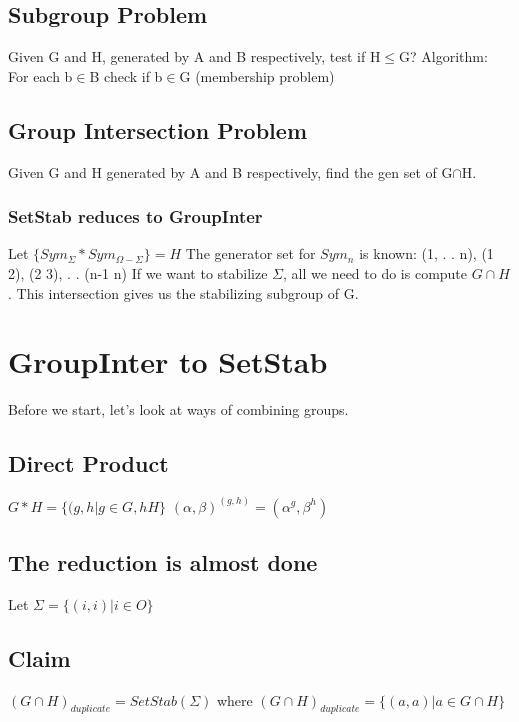 \subsection{Subgroup Problem}
Given G and H, generated by A and B respectively, test if H$\leq$G?\newline \newline
Algorithm:
\,For each b$\in$B check if b$\in$G (membership problem)

\subsection{Group Intersection Problem}
Given G and H generated by A and B respectively, find the gen set of G$\cap$H.


\subsubsection{SetStab reduces to GroupInter}
Let $\{Sym_{\Sigma} * Sym_{\Omega - \Sigma}\} = H$\newline
The generator set for $Sym_n$ is known: (1, . . n), (1 2), (2 3), . . (n-1 n)\newline
If we want to stabilize $\Sigma$, all we need to do is compute $G \cap H$. This intersection gives us the stabilizing subgroup of G.




\section{GroupInter to SetStab}
Before we start, let's look at ways of combining groups.

\subsection{Direct Product}
$G*H=\{(g,h | g \in G,hH\}$
$(\alpha,\beta)^{(g,h )}=(\alpha^g,\beta^h)$

\subsection{The reduction is almost done}
Let $\Sigma=\{ (i,i)| i \in O\}$

\subsection{Claim}
$(G \cap H)_{duplicate} = SetStab(\Sigma)$\newline
where $(G \cap H)_{duplicate} = \{ (a,a) | a\in G \cap H \}$

